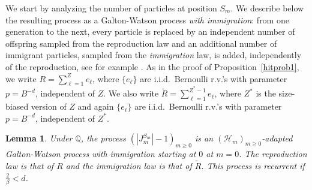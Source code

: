 \documentclass[12pt]{article}
\numberwithin{theorem}{section}
\newtheorem{lemma}[theorem]{Lemma}
\theoremstyle{def}
\numberwithin{equation}{section}
\newcommand{\Q}{\mathbb{Q}}
\newcommand{\cH}{\mathcal H}
\begin{document}
We start by analyzing the number of particles at position $S_m$. 
We describe below the resulting process as a Galton-Watson process \emph{with immigration}: 
from one generation to the next, every particle is replaced by an independent number of offspring sampled from the reproduction law and an additional number of immigrant particles, sampled from the \emph{immigration} law, is added, independently of the reproduction, see for example \cite{Hea65}. 
As in the proof of Proposition~\ref{hitprob1}, we write $R=\sum_{\ell =1}^Z e_\ell$, where $\{e_\ell\}$ are i.i.d.\ Bernoulli r.v.'s with parameter $p=B^{-d}$, independent of $Z$. 
We also write $\tilde{R}=\sum_{\ell =1}^{Z^*-1} e_\ell$, where $Z^*$ is the size-biased version of $Z$ and again $\{e_\ell\}$ are i.i.d.\ Bernoulli r.v.'s with parameter $p=B^{-d}$, independent of $Z^*$.
\begin{lemma}\label{lem:brimm}
	Under $\Q$, the process $\left(|J_m^{S_m}|-1\right)_{m\geq 0}$ is an $(\cH_m)_{m\geq 0}$-adapted Galton-Watson process with immigration starting at $0$ at $m=0$. 
	The reproduction law is that  of $R$ and the immigration law is that of $\tilde{R}$. 
	This process is recurrent if $\frac{2}{\beta} < d$.
\end{lemma}
\end{document}
